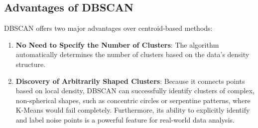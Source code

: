 \subsection*{Advantages of DBSCAN}
DBSCAN offers two major advantages over centroid-based methods:
\begin{enumerate}
    \item \textbf{No Need to Specify the Number of Clusters}: The algorithm automatically determines the number of clusters based on the data's density structure.
    \item \textbf{Discovery of Arbitrarily Shaped Clusters}: Because it connects points based on local density, DBSCAN can successfully identify clusters of complex, non-spherical shapes, such as concentric circles or serpentine patterns, where K-Means would fail completely. Furthermore, its ability to explicitly identify and label noise points is a powerful feature for real-world data analysis.
\end{enumerate}